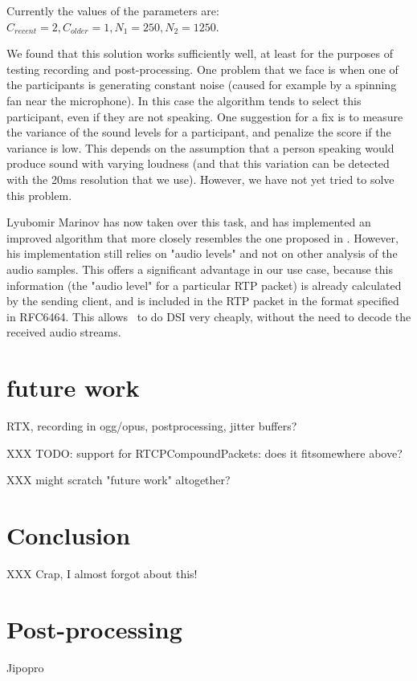 \documentclass[twoside,openright,a4paper,11pt,english]{article}
\begin{document}
Currently the values of the parameters are: $C_{recent} = 2, C_{older} = 1, N_1 = 250, N_2 = 1250$.


\bigskip
We found that this solution works sufficiently well, at least for the purposes
of testing recording and post-processing. One problem that we face is when
one of the participants is generating constant noise (caused for example by a
spinning fan near the microphone). In this case the algorithm tends to select this participant,
even if they are not speaking. One suggestion for a fix is to measure the
variance of the sound levels for a participant, and penalize the score if the
variance is low. This depends on the assumption that a person speaking would
produce sound with varying loudness (and that this variation can be detected
with the 20ms resolution that we use). However, we have not yet tried to solve
this problem.

Lyubomir Marinov has now taken over this task, and has implemented an improved algorithm that more closely resembles the
one proposed in \cite{volfin2012}. However, his implementation still relies on
"audio levels" and not on other analysis of the audio samples. This offers a significant advantage
in our use case, because this information (the "audio level" for a particular RTP packet) is already
calculated by the sending client, and is included in the RTP packet in the format specified in RFC6464\cite{rfc6464}.
This allows \jvb\ to do DSI very cheaply, without the need to decode the received audio streams.




\section{future work}
RTX, recording in ogg/opus, postprocessing, jitter buffers?


XXX TODO: support for RTCPCompoundPackets: does it fitsomewhere above?

XXX might scratch "future work" altogether?

\section{Conclusion}
XXX Crap, I almost forgot about this!

\appendix
\section{Post-processing}
\label{jipopro}
Jipopro
\end{document}
